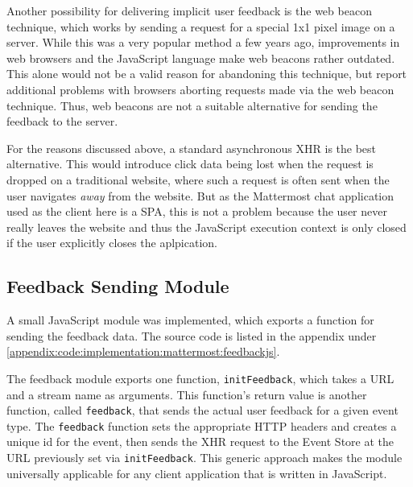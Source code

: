 Another possibility for delivering implicit user feedback is the web beacon technique, which works by sending a request for a special 1x1 pixel image on a server.
While this was a very popular method a few years ago, improvements in web browsers and the JavaScript language make web beacons rather outdated.
This alone would not be a valid reason for abandoning this technique, but \citet{Kohavi2012} report additional problems with browsers aborting requests made via the web beacon technique.
Thus, web beacons are not a suitable alternative for sending the feedback to the server.

For the reasons discussed above, a standard asynchronous \ac{XHR} is the best alternative.
This would introduce click data being lost when the request is dropped on a traditional website, where such a request is often sent when the user navigates \emph{away} from the website.
But as the Mattermost chat application used as the client here is a \ac{SPA}, this is not a problem because the user never really leaves the website and thus the JavaScript execution context is only closed if the user explicitly closes the aplpication.


\subsection{Feedback Sending Module}

A small JavaScript module was implemented, which exports a function for sending the feedback data.
The source code is listed in the appendix under \cref{appendix:code:implementation:mattermost:feedbackjs}.

The feedback module exports one function, \texttt{initFeedback}, which takes a URL and a stream name as arguments.
This function's return value is another function, called \texttt{feedback}, that sends the actual user feedback for a given event type.
The \texttt{feedback} function sets the appropriate \ac{HTTP} headers and creates a unique id for the event, then sends the \ac{XHR} request to the Event Store at the URL previously set via \texttt{initFeedback}.
This generic approach makes the module universally applicable for any client application that is written in JavaScript.

